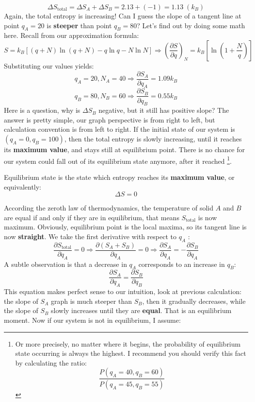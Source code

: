 \documentclass[~/PhyAI/phyai.tex]{subfiles}
\begin{document}
$$ \Delta S_{\text{total}}=\Delta S_{A}+\Delta S_{B}=2.13+(-1)=1.13 \; (k_{B})$$
Again, the total entropy is increasing! Can I guess the slope of a tangent line at point $q_{A}=20$ is \textbf{steeper} than point $q_{B}=80$? Let's find out by doing some math here. Recall from our approximation formula:
$$ S=k_{B}[(q+N)\ln{(q+N)}-q\ln{q}-N\ln{N}]\Rightarrow \left(\frac{\partial S}{\partial q}\right)_{N}=k_{B} \left[\ln\left(1+\frac{N }{q}\right)\right] $$
Substituting our values yields:
$$ q_{A}=20, N_{A}=40\Rightarrow \frac{\partial S_{A}}{\partial q_{A}}= 1.09 k_{B}$$
$$ q_{B}=80, N_{B}=60\Rightarrow \frac{\partial S_{B}}{\partial q_{B}}=  0.55k_{B}$$
Here is a question, why is $\Delta S_{B}$ negative, but it still has positive slope? The answer is pretty simple, our graph perspective is from right to left, but calculation convention is from left to right. If the initial state of our system is $(q_{A}=0, q_{B}=100)$, then the total entropy is slowly increasing, until it reaches its \textbf{maximum value}, and stays still at equilibrium point. There is no chance for our system could fall out of its equilibrium state anymore,  after it reached \footnote[1]{Or more precisely, no matter where it begins, the probability of equilibrium state occurring is always the highest. I recommend you should verify this fact by calculating the ratio: $$ \frac{P(q_{A}=40, q_{B}=60)}{P(q_{A}=45, q_{B}=55)}$$}.
\begin{definition}
	Equilibrium state is the state which entropy reaches its \textbf{maximum value}, or equivalently: $$ \Delta S=0 $$
	\label{Equilibrium Definition}
\end{definition}
According the zeroth law of thermodynamics, the temperature of solid $A$ and $B$ are equal if and only if they are in equilibrium, that means $S_{\text{total}}$ is now maximum. Obviously, equilibrium point is the local maxima, so its tangent line is now \textbf{straight}. We take the first derivative with respect to $q_{A}$ :
$$ \frac{\partial S_{\text{total}}}{\partial q_{A}}=0\Rightarrow \frac{\partial (S_{A}+S_{B})}{\partial q_{A}}=0 \Rightarrow \frac{\partial S_{A} }{\partial q_{A}}=-\frac{\partial S_{B} }{\partial q_{A}}$$
A subtle observation is that a decrease in $q_{A}$ corresponds to an increase in $q_{B}$:
$$ \frac{\partial S_{A} }{\partial q_{A}}=\frac{\partial S_{B}}{\partial q_{B}} $$
This equation makes perfect sense to our intuition, look at previous calculation: the slope of $S_{A}$ graph is much steeper than $S_{B}$, then it gradually decreases, while the slope of $S_{B}$ slowly increases until they are \textbf{equal}. That is an equilibrium moment. Now if our system is not in equilibrium, I assume:
\end{document}
